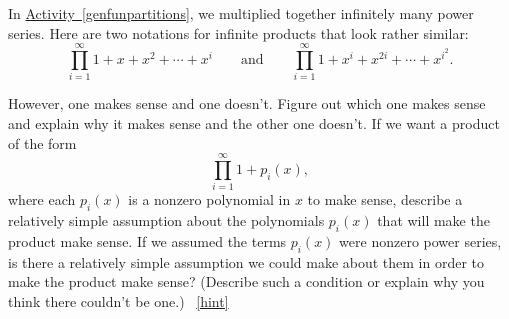 \documentclass{book}
\begin{document}
\setcounter{project}{320}
\addtocounter{project}{-1}
\begin{activity}[]\label{activity-313}
\hypertarget{p-1632}{}%
In \hyperref[genfunpartitions]{Activity~\ref{genfunpartitions}}, we multiplied together infinitely many power series. Here are two notations for infinite products that look rather similar:%
\begin{equation*}
\prod_{i=1}^\infty 1 + x + x^2 +\cdots+ x^i\qquad\mbox{and}\qquad
\prod_{i=1}^\infty 1 +x^i +x^{2i} +\cdots + x^{i^2}.
\end{equation*}
%
\par
\hypertarget{p-1633}{}%
However, one makes sense and one doesn't. Figure out which one makes sense and explain why it makes sense and the other one doesn't. If we want a product of the form%
\begin{equation*}
\prod_{i=1}^\infty 1 +p_i(x),
\end{equation*}
where each \(p_i(x)\) is a nonzero polynomial in \(x\) to make sense, describe a relatively simple assumption about the polynomials \(p_i(x)\) that will make the product make sense. If we assumed the terms \(p_i(x)\) were nonzero power series, is there a relatively simple assumption we could make about them in order to make the product make sense? (Describe such a condition or explain why you think there couldn't be one.)%
~\hfill{\tiny\hyperlink{a-320}{[hint]}\hypertarget{q-320}{}}\end{activity}
\end{document}
